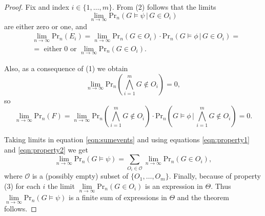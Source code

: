 \documentclass[11pt,notitlepage,a4paper]{article}
\theoremstyle{definition}
\newcommand{\Ln}{\lim\limits_{n\to \infty}}
\begin{document}
\begin{proof}
Fix and index $i\in \{1, \dots, m\}$. From (2) follows that 
the limits 
\[ \Ln \mathrm{Pr}_n(G\models \psi \, | \, G\in O_i )\] 
are either zero or one, and 
\begin{align}\label{eqn:property1}
&\Ln \mathrm{Pr}_n(E_i)= \Ln \mathrm{Pr}_n(G\in O_i)\cdot \mathrm{Pr}_n(G\models \phi \, | \, G\in O_i)=\\ 
&
\nonumber
= \text{ either } 0 \text{ or } \Ln \mathrm{Pr}_n(G\in O_i).
\end{align} 
\par 
Also, as a consequence of (1) we obtain
\[\Ln \mathrm{Pr}_n(\bigwedge_{i=1}^{m} G \notin O_i)=0, \] 
so
\begin{equation}\label{eqn:property2}
\Ln \mathrm{Pr}_n(F)= \Ln \mathrm{Pr}_n(\bigwedge_{i=1}^{m} G \notin O_i)\cdot 
\mathrm{Pr}_n(G\models \phi \, | \, \bigwedge_{i=1}^{m} G \notin O_i)=0.  
\end{equation}
\par
Taking limits in equation \ref{eqn:sumevents} and using equations \ref{eqn:property1} and \ref{eqn:property2} 
we get
\[ \Ln \mathrm{Pr}_n(G\models \psi) = \sum\limits_{O_i\in \mathcal{O}} \Ln
\mathrm{Pr}_n(G \in O_i) ,\]
where $\mathcal{O}$ is a (possibly empty) subset of $\{O_1,\dots, O_{m}\}$.
Finally, because of property (3) for each $i$ the limit $\Ln \mathrm{Pr}_n(G \in O_i)$ is 
an expression in $\Theta$. Thus $\Ln \mathrm{Pr}_n(G\models \psi)$ is a finite sum of expressions in $\Theta$ and the theorem follows.
\end{proof}
\pagebreak


\end{document}
